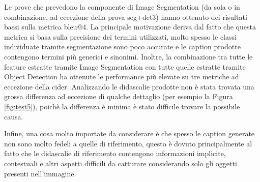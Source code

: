 Le prove che prevedono la componente di Image Segmentation (da sola o in combinazione, ad eccezione della prova seg+det3) hanno ottenuto dei risultati bassi sulla metrica \acrshort{bleu}@4. La principale motivazione deriva dal fatto che questa metrica si basa sulla precisione dei termini utilizzati, molto spesso le classi individuate tramite segmentazione sono poco accurate e le caption prodotte contengono termini più generici e sinonimi.
Inoltre, la combinazione tra tutte le feature estratte tramite Image Segmentation con tutte quelle estratte tramite Object Detection ha ottenute le performance più elevate su tre metriche ad eccezione della \acrshort{cider}. Analizzando le didascalie prodotte non è stata trovata una grossa differenza ad eccezione di qualche dettaglio (per esempio la Figura \ref{fig:test5}), poichè la differenza è minima è stato difficile trovare la possibile causa.

Infine, una cosa molto importate da considerare è che spesso le caption generate non sono molto fedeli a quelle di riferimento, questo è dovuto principalmente al fatto che le didascalie di riferimento contengono informazioni implicite, contestuali e altri aspetti difficili da catturare considerando solo gli oggetti presenti nell'immagine.